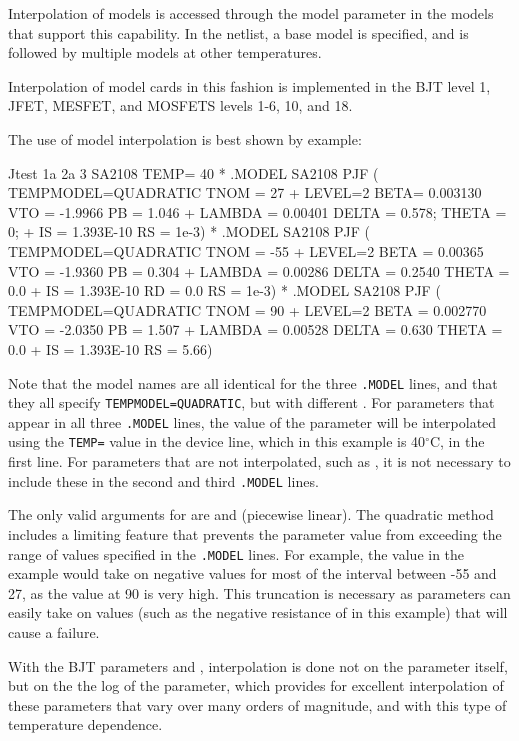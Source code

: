 Interpolation of models is accessed through the model parameter
 in the models that support this capability.  In the
netlist, a base model is specified, and is followed by multiple models at other
temperatures.  

Interpolation of model cards in this fashion is implemented in the BJT level 1,
JFET, MESFET, and MOSFETS levels 1-6, 10, and 18.

The use of model interpolation is best shown by example:

\begin{vquote}
Jtest 1a 2a 3 SA2108 TEMP= 40
*
.MODEL SA2108 PJF ( TEMPMODEL=QUADRATIC TNOM = 27
+ LEVEL=2 BETA= 0.003130 VTO = -1.9966 PB = 1.046
+ LAMBDA = 0.00401 DELTA = 0.578; THETA = 0;
+ IS = 1.393E-10          RS = 1e-3)
*
.MODEL SA2108 PJF ( TEMPMODEL=QUADRATIC TNOM = -55
+ LEVEL=2 BETA = 0.00365 VTO = -1.9360 PB = 0.304
+ LAMBDA = 0.00286 DELTA = 0.2540 THETA = 0.0
+ IS = 1.393E-10 RD = 0.0 RS = 1e-3)
* 
.MODEL SA2108 PJF ( TEMPMODEL=QUADRATIC TNOM = 90
+ LEVEL=2 BETA = 0.002770 VTO = -2.0350 PB = 1.507
+ LAMBDA = 0.00528 DELTA = 0.630 THETA = 0.0
+ IS = 1.393E-10          RS = 5.66)
\end{vquote}

Note that the model names are all identical for the three \texttt{.MODEL}
lines, and that they all specify \texttt{TEMPMODEL=QUADRATIC}, but with
different .  For parameters that appear in all three
\texttt{.MODEL} lines, the value of the parameter will be interpolated using
the \texttt{TEMP=} value in the device line, which in this example is
40$^\circ$C, in the first line.  For parameters that are not interpolated, such
as , it is not necessary to include these in the second and third
\texttt{.MODEL} lines.

The only valid arguments for  are  and
 (piecewise linear).  The quadratic method includes a limiting
feature that prevents the parameter value from exceeding the range of values
specified in the \texttt{.MODEL} lines.  For example, the  value in
the example would take on negative values for most of the interval between -55
and 27, as the value at 90 is very high.  This truncation is necessary as
parameters can easily take on values (such as the negative resistance of
 in this example) that will cause a \Xyce{} failure.

With the BJT parameters  and , interpolation is done
not on the parameter itself, but on the the log of the parameter, which
provides for excellent interpolation of these parameters that vary over many
orders of magnitude, and with this type of temperature dependence.

